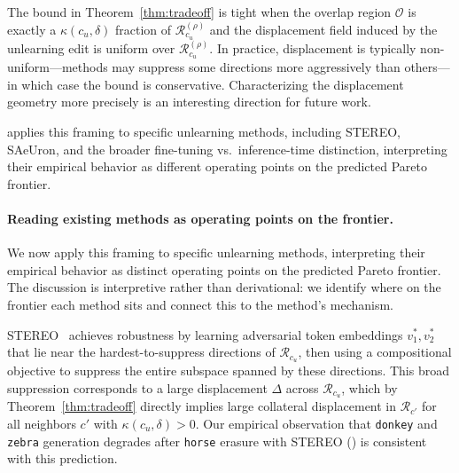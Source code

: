 \begin{remark}
\label{rem:tightness}
The bound in Theorem~\ref{thm:tradeoff} is tight when the overlap region $\mathcal{O}$ is exactly a $\kappa(c_u,\delta)$ fraction of $\mathcal{R}_{c_u}^{(\rho)}$ and the displacement field induced by the unlearning edit is uniform over $\mathcal{R}_{c_u}^{(\rho)}$. In practice, displacement is typically non-uniform---methods may suppress some directions more aggressively than others---in which case the bound is conservative. Characterizing the displacement geometry more precisely is an interesting direction for future work.
\end{remark}
 applies this framing to specific unlearning methods, including STEREO, SAeUron, and the broader fine-tuning vs.\ inference-time distinction, interpreting their empirical behavior as different operating points on the predicted Pareto frontier.

\paragraph{Reading existing methods as operating points on the frontier.}
We now apply this framing to specific unlearning methods, 
interpreting their empirical behavior as distinct operating points on the predicted Pareto frontier. The discussion is interpretive rather than derivational: we identify where on the frontier each method sits and connect this to the method's mechanism.
\begin{remark}
\label{rem:stereo}
STEREO~\citep{srivatsan2025stereo} achieves robustness by learning adversarial token embeddings $v_1^*, v_2^*$ that lie near the hardest-to-suppress directions of $\mathcal{R}_{c_u}$, then using a compositional objective to suppress the entire subspace spanned by these directions. This broad suppression corresponds to a large displacement $\Delta$ across $\mathcal{R}_{c_u}$, which by Theorem~\ref{thm:tradeoff} directly implies large collateral displacement in $\mathcal{R}_{c'}$ for all neighbors $c'$ with $\kappa(c_u,\delta) > 0$. Our empirical observation that \texttt{donkey} and \texttt{zebra} generation degrades after \texttt{horse} erasure with STEREO () is consistent with this prediction.
\end{remark}


